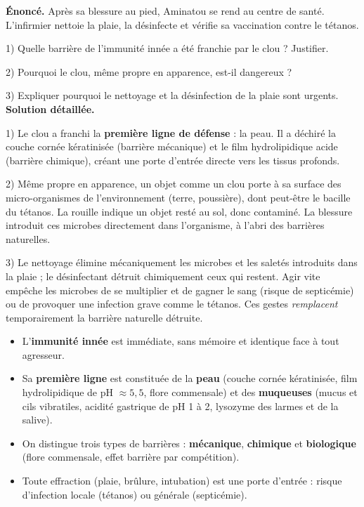 \documentclass[11pt]{article}
\begin{document}
\begin{exoresolu}
\textbf{Énoncé.} Après sa blessure au pied, Aminatou se rend au centre de santé. L'infirmier nettoie la plaie, la désinfecte et vérifie sa vaccination contre le tétanos.\par
1) Quelle barrière de l'immunité innée a été franchie par le clou ? Justifier.\par
2) Pourquoi le clou, même propre en apparence, est-il dangereux ?\par
3) Expliquer pourquoi le nettoyage et la désinfection de la plaie sont urgents.
\tcblower
\textbf{Solution détaillée.}\par
1) Le clou a franchi la \textbf{première ligne de défense} : la peau. Il a déchiré la couche cornée kératinisée (barrière mécanique) et le film hydrolipidique acide (barrière chimique), créant une porte d'entrée directe vers les tissus profonds.\par
2) Même propre en apparence, un objet comme un clou porte à sa surface des micro-organismes de l'environnement (terre, poussière), dont peut-être le bacille du tétanos. La rouille indique un objet resté au sol, donc contaminé. La blessure introduit ces microbes directement dans l'organisme, à l'abri des barrières naturelles.\par
3) Le nettoyage élimine mécaniquement les microbes et les saletés introduits dans la plaie ; le désinfectant détruit chimiquement ceux qui restent. Agir vite empêche les microbes de se multiplier et de gagner le sang (risque de septicémie) ou de provoquer une infection grave comme le tétanos. Ces gestes \emph{remplacent} temporairement la barrière naturelle détruite.
\end{exoresolu}

\begin{aretenir}
\begin{itemize}
\item L'\textbf{immunité innée} est immédiate, sans mémoire et identique face à tout agresseur.
\item Sa \textbf{première ligne} est constituée de la \textbf{peau} (couche cornée kératinisée, film hydrolipidique de pH $\approx 5{,}5$, flore commensale) et des \textbf{muqueuses} (mucus et cils vibratiles, acidité gastrique de pH 1 à 2, lysozyme des larmes et de la salive).
\item On distingue trois types de barrières : \textbf{mécanique}, \textbf{chimique} et \textbf{biologique} (flore commensale, effet barrière par compétition).
\item Toute effraction (plaie, brûlure, intubation) est une porte d'entrée : risque d'infection locale (tétanos) ou générale (septicémie).
\end{itemize}
\end{aretenir}
\end{document}
